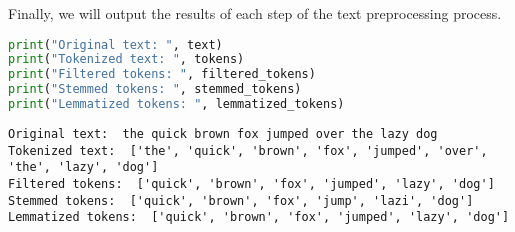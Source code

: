 Finally, we will output the results of each step of the text
preprocessing process.

\begin{lstlisting}[language=Python]
print("Original text: ", text)
print("Tokenized text: ", tokens)
print("Filtered tokens: ", filtered_tokens)
print("Stemmed tokens: ", stemmed_tokens)
print("Lemmatized tokens: ", lemmatized_tokens)
\end{lstlisting}

\begin{lstlisting}
Original text:  the quick brown fox jumped over the lazy dog
Tokenized text:  ['the', 'quick', 'brown', 'fox', 'jumped', 'over', 'the', 'lazy', 'dog']
Filtered tokens:  ['quick', 'brown', 'fox', 'jumped', 'lazy', 'dog']
Stemmed tokens:  ['quick', 'brown', 'fox', 'jump', 'lazi', 'dog']
Lemmatized tokens:  ['quick', 'brown', 'fox', 'jumped', 'lazy', 'dog']
\end{lstlisting}